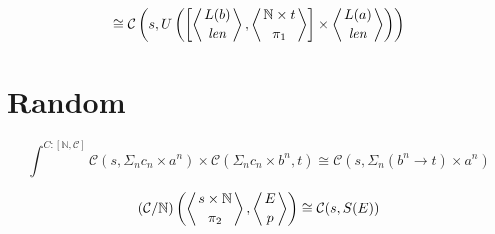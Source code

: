\documentclass[11pt]{amsart}
\begin{document}
\[ \cong \mathcal{C} \left(  s, U\left( 
  \left[ \left \langle {L(b) \atop \mathit{len}} \right \rangle, \left \langle {\mathbb{N} \times t \atop \pi_1} \right \rangle \right] \times \left \langle {L(a) \atop \mathit{len}} \right \rangle \right) \right) \]
  
\section{Random}

\[ \int^{C : [\mathbb{N}, \mathcal{C}]} \mathcal{C}(s, \Sigma_n c_n \times a^n) \times  \mathcal{C}(\Sigma_n c_n \times b^n, t) \cong \mathcal{C}\left( s, \Sigma_n (b^n \to t) \times a^n \right)\]

\[(\mathcal{C}/\mathbb{N}) \left( \left \langle {s\times \mathbb{N} \atop \pi_2} \right \rangle , \left \langle {E \atop p } \right \rangle \right) \cong \mathcal{C} (s, S(E)) \]
\end{document}
